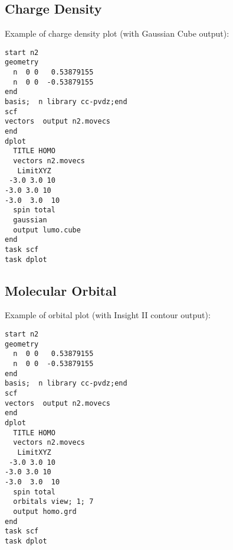 \subsection*{Charge Density}

Example of charge density plot (with Gaussian Cube output):
\begin{verbatim}
start n2
geometry
  n  0 0   0.53879155
  n  0 0  -0.53879155
end
basis;  n library cc-pvdz;end
scf
vectors  output n2.movecs
end
dplot
  TITLE HOMO
  vectors n2.movecs
   LimitXYZ
 -3.0 3.0 10  
-3.0 3.0 10 
-3.0  3.0  10
  spin total
  gaussian
  output lumo.cube
end
task scf     
task dplot
\end{verbatim}

\subsection*{Molecular Orbital}

Example of orbital plot (with Insight II contour output):
\begin{verbatim}
start n2
geometry
  n  0 0   0.53879155
  n  0 0  -0.53879155
end
basis;  n library cc-pvdz;end
scf
vectors  output n2.movecs
end
dplot
  TITLE HOMO
  vectors n2.movecs
   LimitXYZ
 -3.0 3.0 10  
-3.0 3.0 10 
-3.0  3.0  10
  spin total
  orbitals view; 1; 7
  output homo.grd
end
task scf     
task dplot
\end{verbatim}
